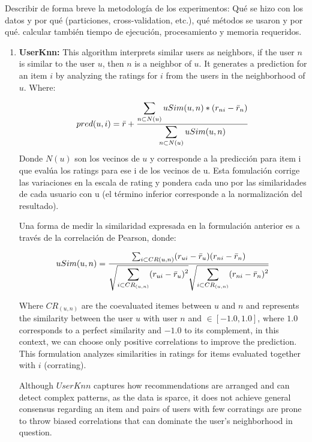 \documentclass[letterpaper, 10 pt, conference]{ieeeconf}  %
\begin{document}
Describir de forma breve la metodología de los experimentos: Qué
se hizo con los datos y por qué (particiones, cross-validation, etc.), qué métodos se usaron y por
qué.
calcular también tiempo de ejecución, procesamiento y memoria requeridos.
\begin{enumerate}

    \item \textbf{UserKnn:} This algorithm interprets similar users as neighbors, if the user $n$ is similar to the user $u$, then $n$ is a neighbor of $u$. It generates a prediction for an item $i$ by analyzing the ratings for $i$ from the users in the neighborhood of $u$. Where:
    
    \begin{equation}
        pred(u,i)=\Bar{r}+ \frac{\displaystyle \sum_{n \subset N(u)}uSim(u,n)*(r_{ni}-\Bar{r}_{n})}{\displaystyle \sum_{n \subset N(u)}uSim(u,n)}
    \end{equation}
    Donde $N(u)$ son los vecinos de $u$ y corresponde a la predicción para item i que evalúa los ratings para ese i de los vecinos de u. Esta fomulación corrige las variaciones en la escala de rating y pondera cada uno por las similaridades de cada usuario con u (el término inferior corresponde a la normalización del resultado).
    
    Una forma de medir la similaridad expresada en la formulación anterior es a través de la correlación de Pearson, donde: 
    
    \begin{equation}
        uSim(u,n)= \frac{ \sum_{i \subset CR(u,n)}(r_{ui}-\Bar{r}_{u})(r_{ni}-\Bar{r}_{n})}{ \displaystyle \sqrt{\displaystyle \sum_{i \subset CR_{(u,n)}}(r_{ui}-\Bar{r}_{u})^2}  \sqrt{\displaystyle \sum_{i \subset CR_{(u,n)}}(r_{ni}-\Bar{r}_{n})^2} }
    \end{equation}
    
    Where $CR_{(u, n)} $ are the coevaluated itemes between $ u $ and $ n $ and represents the similarity between the user $ u $ with user  $ n $ and $ \in [-1.0, 1.0] $, where $ 1.0 $ corresponds to a perfect similarity and $ -1.0 $ to its complement, in this context, we can choose only positive correlations to improve the prediction. This formulation analyzes similarities in ratings for items evaluated together with $ i $ (corrating).
    
    Although $UserKnn$ captures how recommendations are arranged and can detect complex patterns, as the data is sparce, it does not achieve general consensus regarding an item and pairs of users with few corratings are prone to throw biased correlations that can dominate the user's neighborhood in question.
    

\end{enumerate}
\end{document}

